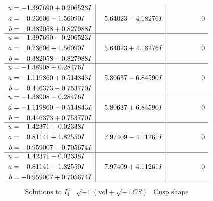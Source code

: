 \documentclass[1p]{elsarticle_modified}
\theoremstyle{definition}
\newcommand{\I}{\sqrt{-1}}
\begin{document}
$$\begin{array}{c|c|c}
\begin{aligned}
u &= -1.397690 + 0.206523 I \\
a &= \phantom{-}0.23606 - 1.56090 I \\
b &= \phantom{-}0.382058 + 0.827988 I\end{aligned}
 & \phantom{-}5.64023 - 4.18276 I & \phantom{-0.000000 } 0 \\ \hline\begin{aligned}
u &= -1.397690 - 0.206523 I \\
a &= \phantom{-}0.23606 + 1.56090 I \\
b &= \phantom{-}0.382058 - 0.827988 I\end{aligned}
 & \phantom{-}5.64023 + 4.18276 I & \phantom{-0.000000 } 0 \\ \hline\begin{aligned}
u &= -1.38908 + 0.28476 I \\
a &= -1.119860 + 0.514843 I \\
b &= \phantom{-}0.446373 - 0.753770 I\end{aligned}
 & \phantom{-}5.80637 - 6.84590 I & \phantom{-0.000000 } 0 \\ \hline\begin{aligned}
u &= -1.38908 - 0.28476 I \\
a &= -1.119860 - 0.514843 I \\
b &= \phantom{-}0.446373 + 0.753770 I\end{aligned}
 & \phantom{-}5.80637 + 6.84590 I & \phantom{-0.000000 } 0 \\ \hline\begin{aligned}
u &= \phantom{-}1.42371 + 0.02338 I \\
a &= \phantom{-}0.81141 + 1.82550 I \\
b &= -0.959007 - 0.705674 I\end{aligned}
 & \phantom{-}7.97409 - 4.11261 I & \phantom{-0.000000 } 0 \\ \hline\begin{aligned}
u &= \phantom{-}1.42371 - 0.02338 I \\
a &= \phantom{-}0.81141 - 1.82550 I \\
b &= -0.959007 + 0.705674 I\end{aligned}
 & \phantom{-}7.97409 + 4.11261 I & \phantom{-0.000000 } 0\\
 \hline 
 \end{array}$$\newpage$$\begin{array}{c|c|c}  
\text{Solutions to }I^u_{1}& \I (\text{vol} + \sqrt{-1}CS) & \text{Cusp shape}\\

\end{array}$$
\end{document}
